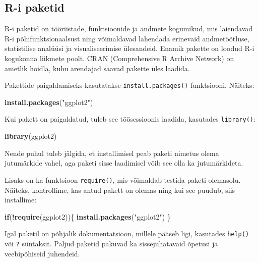 \documentclass[
]{book}
\newenvironment{Shaded}{\begin{snugshade}}{\end{snugshade}}
\newcommand{\ControlFlowTok}[1]{\textcolor[rgb]{0.13,0.29,0.53}{\textbf{#1}}}
\newcommand{\FunctionTok}[1]{\textcolor[rgb]{0.13,0.29,0.53}{\textbf{#1}}}
\newcommand{\NormalTok}[1]{#1}
\newcommand{\SpecialCharTok}[1]{\textcolor[rgb]{0.81,0.36,0.00}{\textbf{#1}}}
\newcommand{\StringTok}[1]{\textcolor[rgb]{0.31,0.60,0.02}{#1}}
\renewenvironment{Shaded} {\begin{snugshade}\footnotesize} {\end{snugshade}}
\begin{document}
\subsection{R-i paketid}\label{r-i-paketid}

R-i paketid on tööriistade, funktsioonide ja andmete kogumikud, mis laiendavad R-i põhifunktsionaalsust ning võimaldavad lahendada erinevaid andmetöötluse, statistilise analüüsi ja visualiseerimise ülesandeid. Enamik pakette on loodud R-i kogukonna liikmete poolt. CRAN (Comprehensive R Archive Network) on ametlik hoidla, kuhu arendajad saavad pakette üles laadida.

Pakettide paigaldamiseks kasutatakse \texttt{install.packages()} funktsiooni. Näiteks:

\begin{Shaded}
\begin{Highlighting}[]
\FunctionTok{install.packages}\NormalTok{(}\StringTok{"ggplot2"}\NormalTok{)}
\end{Highlighting}
\end{Shaded}

Kui pakett on paigaldatud, tuleb see töösessioonis laadida, kasutades \texttt{library()}:

\begin{Shaded}
\begin{Highlighting}[]
\FunctionTok{library}\NormalTok{(ggplot2)}
\end{Highlighting}
\end{Shaded}

Nende puhul tuleb jälgida, et installimisel peab paketi nimetus olema jutumärkide vahel, aga paketi sisse laadimisel võib see olla ka jutumärkideta.

Lisaks on ka funktsioon \texttt{require()}, mis võimaldab testida paketi olemasolu. Näiteks, kontrollime, kas antud pakett on olemas ning kui see puudub, siis installime:

\begin{Shaded}
\begin{Highlighting}[]
\ControlFlowTok{if}\NormalTok{(}\SpecialCharTok{!}\FunctionTok{require}\NormalTok{(ggplot2))\{}
    \FunctionTok{install.packages}\NormalTok{(}\StringTok{"ggplot2"}\NormalTok{)    }
\NormalTok{\}}
\end{Highlighting}
\end{Shaded}

Igal paketil on põhjalik dokumentatsioon, millele pääseb ligi, kasutades \texttt{help()} või \texttt{?} süntaksit. Paljud paketid pakuvad ka sissejuhatavaid õpetusi ja veebipõhiseid juhendeid.
\end{document}
